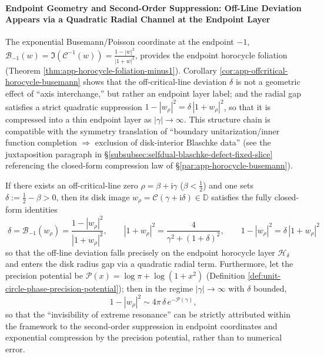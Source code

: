\paragraph{Endpoint Geometry and Second-Order Suppression: Off-Line Deviation Appears via a Quadratic Radial Channel at the Endpoint Layer}
The exponential Busemann/Poisson coordinate at the endpoint \(-1\),
\(\mathcal{B}_{-1}(w)=\Im(\mathcal{C}^{-1}(w))=\frac{1-|w|^2}{|1+w|^2}\),
provides the endpoint horocycle foliation (Theorem \ref{thm:app-horocycle-foliation-minus1}).
Corollary \ref{cor:app-offcritical-horocycle-busemann} shows that the off-critical-line deviation \(\delta\) is not a geometric effect of ``axis interchange,'' but rather an endpoint layer label; and the radial gap satisfies a strict quadratic suppression
\(1-|w_\rho|^2=\delta\,|1+w_\rho|^2\), so that it is compressed into a thin endpoint layer as \(|\gamma|\to\infty\).
This structure chain is compatible with the symmetry translation of ``boundary unitarization/inner function completion \(\Rightarrow\) exclusion of disk-interior Blaschke data'' (see the juxtaposition paragraph in \S\ref{subsubsec:selfdual-blaschke-defect-fixed-slice} referencing the closed-form compression law of \S\ref{par:app-horocycle-busemann}).

\begin{theorem}\label{thm:xi-endpoint-compression-precision}
If there exists an off-critical-line zero \(\rho=\beta+\mathrm{i}\gamma\) (\(\beta<\tfrac12\)) and one sets \(\delta:=\tfrac12-\beta>0\), then its disk image \(w_\rho=\mathcal{C}(\gamma+\mathrm{i}\delta)\in\mathbb{D}\) satisfies the fully closed-form identities
\[
\boxed{\;
\delta=\mathcal{B}_{-1}(w_\rho)=\frac{1-|w_\rho|^2}{|1+w_\rho|^2},\qquad
|1+w_\rho|^2=\frac{4}{\gamma^2+(1+\delta)^2},\qquad
1-|w_\rho|^2=\delta\,|1+w_\rho|^2\;}
\]
so that the off-line deviation falls precisely on the endpoint horocycle layer \(\mathcal{H}_\delta\) and enters the disk radius gap via a quadratic radial term.
Furthermore, let the precision potential be \(\mathcal{P}(x)=\log\pi+\log(1+x^2)\) (Definition \ref{def:unit-circle-phase-precision-potential}); then in the regime \(|\gamma|\to\infty\) with \(\delta\) bounded,
\[
1-|w_\rho|^2\sim 4\pi\,\delta\,e^{-\mathcal{P}(\gamma)},
\]
so that the ``invisibility of extreme resonance'' can be strictly attributed within the framework to the second-order suppression in endpoint coordinates and exponential compression by the precision potential, rather than to numerical error.
\end{theorem}


